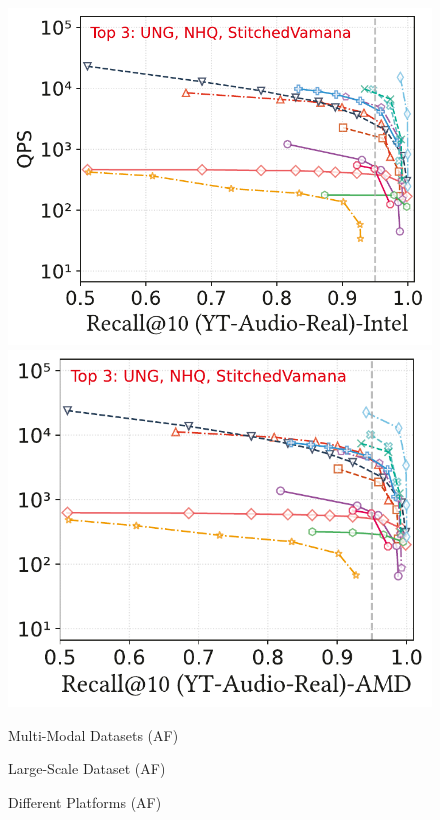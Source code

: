 \documentclass[sigconf, nonacm, pdfa]{acmart}
\begin{document}
{\begin{figure}
\begin{minipage}[t]{0.20\textwidth}
	\end{minipage}
	\hfill %
	\begin{minipage}[t]{0.37\textwidth}
		\centering
		\includegraphics[width=0.495\linewidth]{figures/exp/attribute_85.pdf}
		\hfill
		\includegraphics[width=0.47\linewidth]{figures/exp/attribute_71.pdf}
		
	\end{minipage}

\end{figure}


\begin{figure}
	\centering
	\begin{minipage}[t]{0.37\textwidth}
		\centering
		\setlength{\abovecaptionskip}{-0.2cm}
		\setlength{\belowcaptionskip}{-0.25cm}
		\caption{Multi-Modal Datasets (AF)}
		\label{fig:attribute-multimodal}  
	\end{minipage}%
	\hfill
	\begin{minipage}[t]{0.27\textwidth}
		\centering
		\setlength{\abovecaptionskip}{-0.2cm}
		\setlength{\belowcaptionskip}{-0.25cm}
		\caption{Large-Scale Dataset (AF)}
		\label{fig:attribute big dataset}
	\end{minipage}
	\hfill 
	\begin{minipage}[t]{0.35\textwidth}
		\centering
		\setlength{\abovecaptionskip}{-0.2cm}
		\setlength{\belowcaptionskip}{-0.25cm}
		\caption{Different Platforms (AF)}
		\label{fig:attribute-cross-platform}
	\end{minipage}%
\end{figure}
	


}
\end{document}
